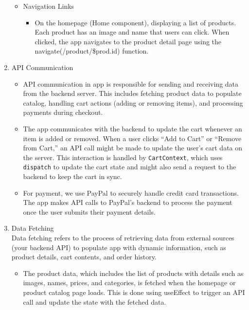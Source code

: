 \documentclass{llncs}
\begin{document}
\begin{enumerate}
\begin{itemize}
        \item Navigation Links
        \begin{itemize}
            \item On the homepage (Home component), displaying a list of products. Each product has an image and name that users can click. When clicked, the app navigates to the product detail page using the navigate(/product/\${prod.id}) function.\\
        \end{itemize}
    \end{itemize}
    \item API Communication 
    \begin{itemize}
        \item API communication in app is responsible for sending and receiving data from the backend server. This includes fetching product data to populate catalog, handling cart actions (adding or removing items), and processing payments during checkout.
        \item The app communicates with the backend to update the cart whenever an item is added or removed. When a user clicks ``Add to Cart'' or ``Remove from Cart,'' an API call might be made to update the user's cart data on the server. This interaction is handled by \texttt{CartContext}, which uses \texttt{dispatch} to update the cart state and might also send a request to the backend to keep the cart in sync.
        \item For payment, we use PayPal to securely handle credit card transactions. The app makes API calls to PayPal's backend to process the payment once the user submits their payment details.\\
    \end{itemize}
    \item Data Fetching \\
    Data fetching refers to the process of retrieving data from external sources (your backend API) to populate app with dynamic information, such as product details, cart contents, and order history.
    \begin{itemize}
        \item The product data, which includes the list of products with details such as images, names, prices, and categories, is fetched when the homepage or product catalog page loads. This is done using useEffect to trigger an API call and update the state with the fetched data.
    \end{itemize}
\end{enumerate}
\end{document}
